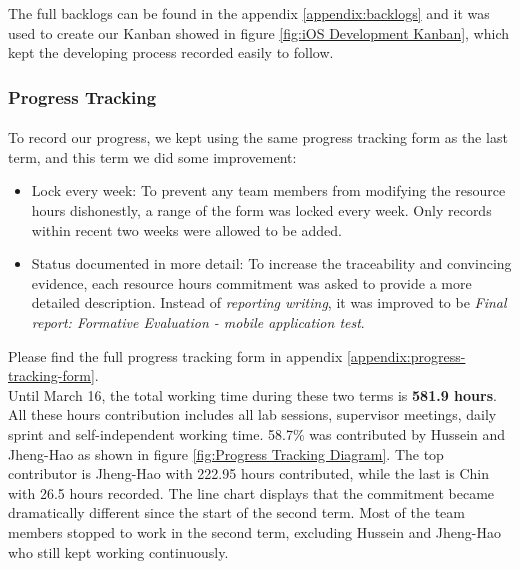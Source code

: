 \documentclass[12pt,a4paper]{article}
\begin{document}
          The full backlogs can be found in the appendix \ref{appendix:backlogs} and it was used to create our Kanban showed in figure \ref{fig:iOS Development Kanban}, which kept the developing process recorded easily to follow.        
          
        \subsubsection{Progress Tracking}
          \paragraph{}To record our progress, we kept using the same progress tracking form as the last term, and this term we did some improvement:

          \begin{itemize}
            \item {Lock every week}: To prevent any team members from modifying the resource hours dishonestly, a range of the form was locked every week. Only records within recent two weeks were allowed to be added. 
            \item {Status documented in more detail}: To increase the traceability and convincing evidence, each resource hours commitment was asked to provide a more detailed description. Instead of {\it reporting writing}, it was improved to be {\it Final report: Formative Evaluation - mobile application test}.
          \end{itemize}

          Please find the full progress tracking form in appendix \ref{appendix:progress-tracking-form}.\\
          
          Until March 16, the total working time during these two terms is {\bf 581.9 hours}. All these hours contribution includes all lab sessions, supervisor meetings, daily sprint and self-independent working time. 58.7\% was contributed by Hussein and Jheng-Hao as shown in figure \ref{fig:Progress Tracking Diagram}. The top contributor is Jheng-Hao with 222.95 hours contributed, while the last is Chin with 26.5 hours recorded. The line chart displays that the commitment became dramatically different since the start of the second term. Most of the team members stopped to work in the second term, excluding Hussein and Jheng-Hao who still kept working continuously.
          
\end{document}
